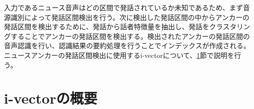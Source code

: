 入力であるニュース音声はどの区間で発話されているか未知であるため、まず音源識別によって発話区間検出を行う。次に検出した発話区間の中からアンカーの発話区間を検出するために、発話から話者特徴量を抽出し、発話をクラスタリングすることでアンカーの発話区間を検出する。検出されたアンカーの発話区間の音声認識を行い、認識結果の要約処理を行うことでインデックスが作成される。ニュースアンカーの発話区間検出に使用するi-vectorについて、\ref{chapter:iv}節で説明を行う。

%

\section{i-vectorの概要}
\label{chapter:iv}


%
